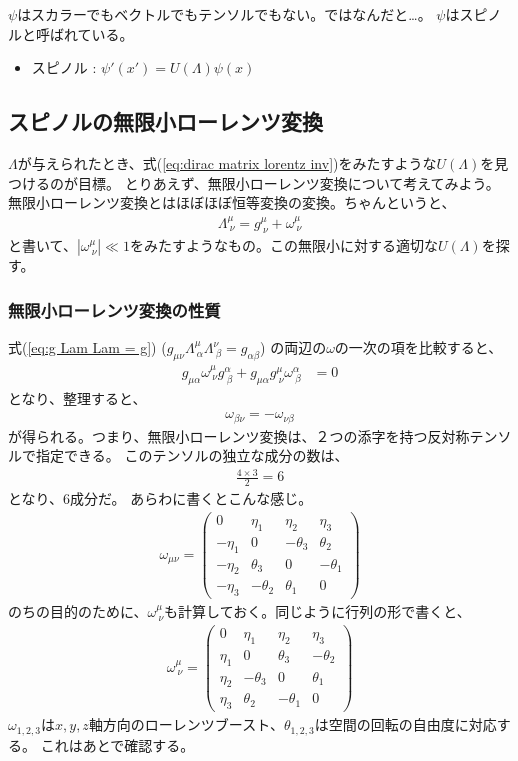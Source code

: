 \documentclass[10pt,a4paper]{jarticle}
\begin{document}
$\psi$はスカラーでもベクトルでもテンソルでもない。ではなんだと…。
$\psi$はスピノルと呼ばれている。
\begin{itemize}
\item スピノル  : $\psi'(x') = U(\Lambda) \psi(x)$
\end{itemize}


\subsection{スピノルの無限小ローレンツ変換}
$\Lambda$が与えられたとき、式(\ref{eq:dirac matrix lorentz inv})をみたすような$U(\Lambda)$を見つけるのが目標。
とりあえず、無限小ローレンツ変換について考えてみよう。
無限小ローレンツ変換とはほぼほぼ恒等変換の変換。ちゃんというと、
\begin{align}
\Lambda^\mu_{~\nu} = g^\mu_{~\nu} + \omega^{\mu}_{~\nu}
\end{align}
と書いて、$|\omega^{\mu}_{~\nu}| \ll 1$をみたすようなもの。この無限小に対する適切な$U(\Lambda)$を探す。

\subsubsection{無限小ローレンツ変換の性質}
式(\ref{eq:g Lam Lam = g}) ($g_{\mu\nu} \Lambda^\mu_{~\alpha} \Lambda^\nu_{~\beta} = g_{\alpha\beta}$) の両辺の$\omega$の一次の項を比較すると、
\begin{align}
g_{\mu\alpha} \omega^\mu_{~\nu} g^\alpha_{~\beta} + g_{\mu\alpha} g^\mu_{~\nu} \omega^\alpha_{~\beta} &= 0
\end{align}
となり、整理すると、
\begin{align}
\omega_{\beta\nu} = -\omega_{\nu\beta}
\end{align}
が得られる。つまり、無限小ローレンツ変換は、２つの添字を持つ反対称テンソルで指定できる。
このテンソルの独立な成分の数は、
\begin{align}
\frac{4 \times 3}{2} = 6
\end{align}
となり、6成分だ。
あらわに書くとこんな感じ。
\begin{align}
\omega_{\mu\nu}
= 
\left(\begin{array}{cccc}
0 & \eta_1 & \eta_2 & \eta_3 \\
-\eta_1 & 0 & -\theta_3 & \theta_2 \\
-\eta_2 & \theta_3 & 0 & -\theta_1 \\
-\eta_3 & -\theta_2 & \theta_1 & 0
\end{array}\right)
\end{align}
のちの目的のために、$\omega^\mu_{~\nu}$も計算しておく。同じように行列の形で書くと、
\begin{align}
\omega^\mu_{~\nu}
= 
\left(\begin{array}{cccc}
0 & \eta_1 & \eta_2 & \eta_3 \\
\eta_1 & 0 & \theta_3 & -\theta_2 \\
\eta_2 & -\theta_3 & 0 & \theta_1 \\
\eta_3 & \theta_2 & -\theta_1 & 0
\end{array}\right)
\end{align}
$\omega_{1,2,3}$は$x,y,z$軸方向のローレンツブースト、$\theta_{1,2,3}$は空間の回転の自由度に対応する。
これはあとで確認する。
\end{document}
